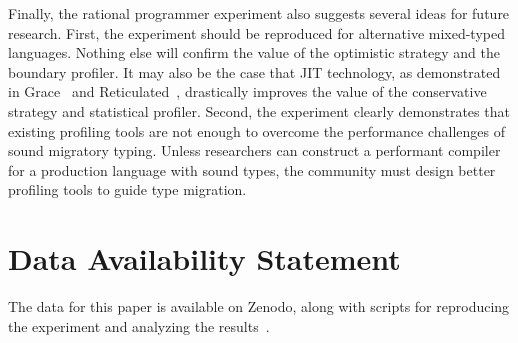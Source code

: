 Finally, the rational programmer experiment also suggests several ideas for
future research. First, the experiment should be reproduced for alternative
mixed-typed languages. Nothing else will confirm the value of the optimistic
strategy and the boundary profiler.
It may also be the case that JIT technology, as demonstrated
in Grace~\cite{rmhn-ecoop-2019} and Reticulated~\cite{vsc-dls-2019}, drastically improves the value
of the conservative strategy and statistical profiler.
Second, the
experiment clearly demonstrates that existing profiling tools are not enough to
overcome the performance challenges of sound migratory typing. Unless researchers
can construct a performant compiler for a production language with sound
types, the community must design better profiling tools to guide
type migration.










\section*{Data Availability Statement}

The data for this paper is available on Zenodo,
along with scripts for reproducing the experiment
and analyzing the results~\cite{gdf-artifact-2023}.

